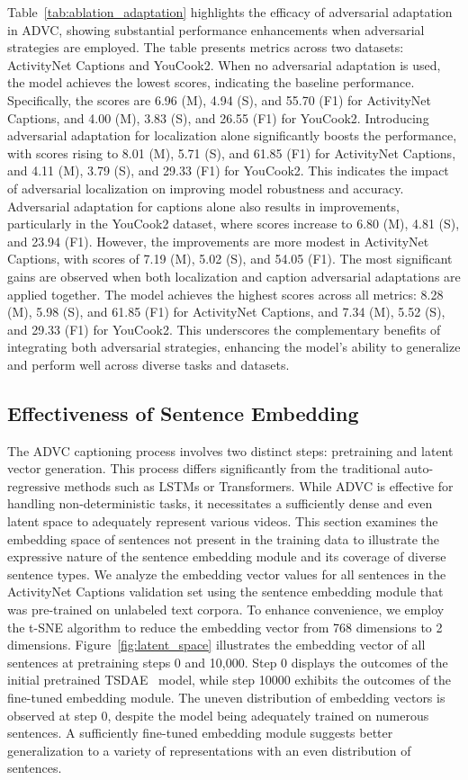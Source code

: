 Table~\ref{tab:ablation_adaptation} highlights the efficacy of adversarial adaptation in ADVC, showing substantial performance enhancements when adversarial strategies are employed.
The table presents metrics across two datasets: ActivityNet Captions and YouCook2.
When no adversarial adaptation is used, the model achieves the lowest scores, indicating the baseline performance.
Specifically, the scores are 6.96 (M), 4.94 (S), and 55.70 (F1) for ActivityNet Captions, and 4.00 (M), 3.83 (S), and 26.55 (F1) for YouCook2.
Introducing adversarial adaptation for localization alone significantly boosts the performance, with scores rising to 8.01 (M), 5.71 (S), and 61.85 (F1) for ActivityNet Captions, and 4.11 (M), 3.79 (S), and 29.33 (F1) for YouCook2.
This indicates the impact of adversarial localization on improving model robustness and accuracy.
Adversarial adaptation for captions alone also results in improvements, particularly in the YouCook2 dataset, where scores increase to 6.80 (M), 4.81 (S), and 23.94 (F1).
However, the improvements are more modest in ActivityNet Captions, with scores of 7.19 (M), 5.02 (S), and 54.05 (F1).
The most significant gains are observed when both localization and caption adversarial adaptations are applied together.
The model achieves the highest scores across all metrics: 8.28 (M), 5.98 (S), and 61.85 (F1) for ActivityNet Captions, and 7.34 (M), 5.52 (S), and 29.33 (F1) for YouCook2.
This underscores the complementary benefits of integrating both adversarial strategies, enhancing the model's ability to generalize and perform well across diverse tasks and datasets.

\subsection{Effectiveness of Sentence Embedding}
The ADVC captioning process involves two distinct steps: pretraining and latent vector generation.
This process differs significantly from the traditional auto-regressive methods such as LSTMs or Transformers.
While ADVC is effective for handling non-deterministic tasks, it necessitates a sufficiently dense and even latent space to adequately represent various videos.
This section examines the embedding space of sentences not present in the training data to illustrate the expressive nature of the sentence embedding module and its coverage of diverse sentence types.
We analyze the embedding vector values for all sentences in the ActivityNet Captions validation set using the sentence embedding module that was pre-trained on unlabeled text corpora.
To enhance convenience, we employ the t-SNE algorithm to reduce the embedding vector from 768 dimensions to 2 dimensions.
Figure~\ref{fig:latent_space} illustrates the embedding vector of all sentences at pretraining steps 0 and 10,000.
Step 0 displays the outcomes of the initial pretrained TSDAE~\cite{Wang2022-um} model, while step 10000 exhibits the outcomes of the fine-tuned embedding module.
The uneven distribution of embedding vectors is observed at step 0, despite the model being adequately trained on numerous sentences.
A sufficiently fine-tuned embedding module suggests better generalization to a variety of representations with an even distribution of sentences.

